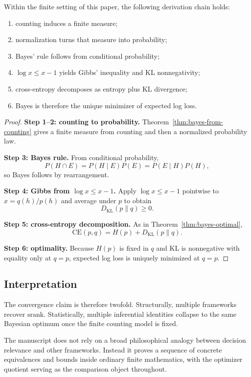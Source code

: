 \begin{theorem}\label{thm:bayesian-optimality-chain}
Within the finite setting of this paper, the following derivation chain holds:
\begin{enumerate}
\item counting induces a finite measure;
\item normalization turns that measure into probability;
\item Bayes' rule follows from conditional probability;
\item $\log x \le x-1$ yields Gibbs' inequality and KL nonnegativity;
\item cross-entropy decomposes as entropy plus KL divergence;
\item Bayes is therefore the unique minimizer of expected log loss.
\end{enumerate}
\end{theorem}

\begin{proof}
\textbf{Step 1--2: counting to probability.}
Theorem~\ref{thm:bayes-from-counting} gives a finite measure from counting and then a normalized probability law.

\textbf{Step 3: Bayes rule.}
From conditional probability,
\[
P(H\cap E)=P(H\mid E)P(E)=P(E\mid H)P(H),
\]
so Bayes follows by rearrangement.

\textbf{Step 4: Gibbs from $\log x\le x-1$.}
Apply $\log x\le x-1$ pointwise to $x=q(h)/p(h)$ and average under $p$ to obtain
\[
D_{\mathrm{KL}}(p\|q)\ge 0.
\]

\textbf{Step 5: cross-entropy decomposition.}
As in Theorem~\ref{thm:bayes-optimal},
\[
\mathrm{CE}(p,q)=H(p)+D_{\mathrm{KL}}(p\|q).
\]

\textbf{Step 6: optimality.}
Because $H(p)$ is fixed in $q$ and KL is nonnegative with equality only at $q=p$, expected log loss is uniquely minimized at $q=p$.
\end{proof}

\subsection{Interpretation}

The convergence claim is therefore twofold. Structurally, multiple frameworks recover $\mathrm{srank}$. Statistically, multiple inferential identities collapse to the same Bayesian optimum once the finite counting model is fixed.

The manuscript does not rely on a broad philosophical analogy between decision relevance and other frameworks. Instead it proves a sequence of concrete equivalences and bounds inside ordinary finite mathematics, with the optimizer quotient serving as the comparison object throughout.
